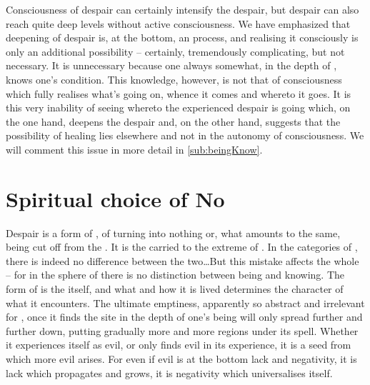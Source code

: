 Consciousness of despair can certainly intensify the despair, but despair can 
also reach quite deep levels without active consciousness.  We have emphasized
that deepening of despair is, at the bottom, an  process, and
realising it consciously is only an additional possibility -- certainly,
tremendously complicating, but not necessary.  It 
 is unnecessary because one always somewhat, in the depth of , knows 
 one's  condition. This knowledge, however, is not that of
 consciousness which fully realises what's going on, whence it comes and
whereto it goes. It is this very inability of  seeing whereto the
experienced despair is going which, on the one hand, deepens the despair and, on
the other hand, suggests that the possibility of healing lies elsewhere and not
in the autonomy of consciousness. 
We will comment this issue in more detail in \ref{sub:beingKnow}.


\section{Spiritual choice of No}\label{sec:evil}
\pa\label{pa:evilsSuffer}
Despair is a form of , of turning  into nothing
or, what amounts to the same, being cut off from the . It is the
  carried to the  extreme of
. In the  categories of , there is
indeed no difference between the two\ldots But this  mistake affects
the whole  -- for in the sphere of  there is no
distinction between being and knowing. The form of  is the
 itself, and what and how it is lived determines the
 character of what it encounters. The ultimate emptiness,
apparently so abstract and irrelevant for \herenow, once it finds the site in
the depth of one's being will only spread further and further down, putting
gradually more and more regions under its spell. Whether it experiences itself
as evil, or only finds evil in its experience, it is a seed from which more evil
arises. For even if evil is at the bottom lack and negativity, it is lack which
propagates and grows, it is negativity which universalises itself.

